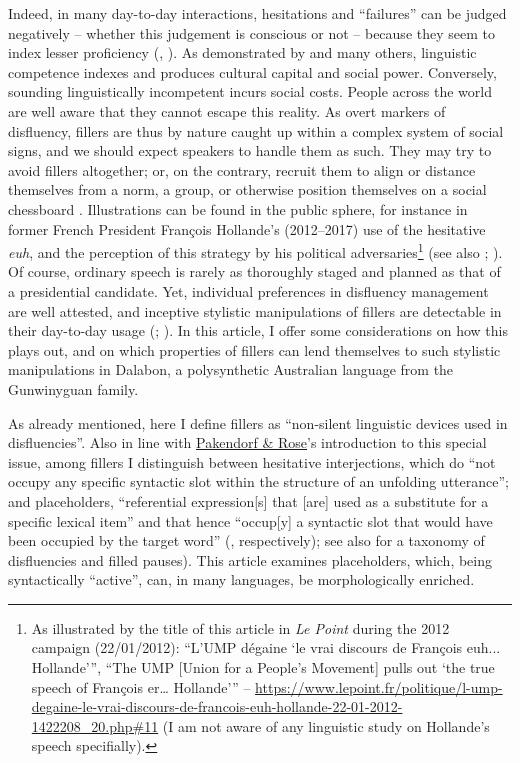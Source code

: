 \documentclass[output=paper]{langscibook}
\begin{document}
Indeed, in many day-to-day interactions, hesitations and “failures” can be judged negatively – whether this judgement is conscious or not – because they seem to index lesser proficiency (\citealt{FehringerFehringer2007}, \citealt{Jong2016}). As demonstrated by \citet{Bourdieu2001} and many others, linguistic competence indexes and produces cultural capital and social power. Conversely, sounding linguistically incompetent incurs social costs. People across the world are well aware that they cannot escape this reality. As overt markers of disfluency, fillers are thus by nature caught up within a complex system of social signs, and we should expect speakers to handle them as such. They may try to avoid fillers altogether; or, on the contrary, recruit them to align or distance themselves from a norm, a group, or otherwise position themselves on a social chessboard \citep{Silverstein2003}. Illustrations can be found in the public sphere, for instance in former French President François Hollande’s (2012--2017) use of the hesitative \textit{euh}, and the perception of this strategy by his political adversaries\footnote{As illustrated by the title of this article in \textit{Le Point} during the 2012 campaign (22/01/2012): “L’UMP dégaine ‘le vrai discours de François euh... Hollande’”, “The UMP [Union for a People’s Movement] pulls out ‘the true speech of François er… Hollande’” –  \url{https://www.lepoint.fr/politique/l-ump-degaine-le-vrai-discours-de-francois-euh-hollande-22-01-2012-1422208_20.php\#11} (I am not aware of any linguistic study on Hollande’s speech specifially).} (see also \citealt{Duez1999}; \citealt{MareüilMareüil2013}). Of course, ordinary speech is rarely as thoroughly staged and planned as that of a presidential candidate. Yet, individual preferences in disfluency \mbox{management} are well attested, and inceptive stylistic manipulations of fillers are detectable in their day-to-day usage (\citealt{LasernaLaserna2014}; \citealt{BraunBraun2023}). In this article, I offer some considerations on how this plays out, and on which properties of fillers can lend themselves to such stylistic manipulations in Dalabon, a polysynthetic Australian language from the Gunwinyguan family.

As already mentioned, here I define fillers as “non-silent linguistic devices used in disfluencies”. Also in line with \href{chapters/intro}{ Pakendorf \& Rose}’s introduction to this special issue, among fillers I distinguish between hesitative interjections, which do “not occupy any specific syntactic slot within the structure of an unfolding utterance”; and placeholders, “referential expression[s] that [are] used as a substitute for a specific lexical item” and that hence “occup[y] a syntactic slot that would have been occupied by the target word” (\citet[507, 490]{HayashiHayashi2006}, respectively); see also \citet{BraunBraun2023} for a taxonomy of disfluencies and filled pauses). This article examines placeholders, which, being syntactically “active”, can, in many languages, be morphologically enriched. 
\end{document}
